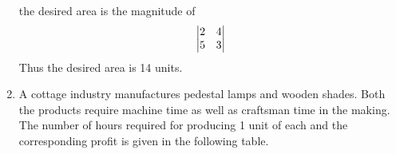 \documentclass[journal,12pt,twocolumn]{IEEEtran}
\renewcommand\thesection{\arabic{section}}
\begin{document}
\begin{enumerate}[label=\thesection.\arabic*.,ref=\thesection.\theenumi]
    the desired area is  the magnitude of 
\begin{align}
 \begin{vmatrix}2 & 4\\5 & 3\end{vmatrix} 
    \end{align}
    Thus the desired area is 14 units.
\item A cottage industry manufactures pedestal lamps and wooden shades. Both the products require machine time as well as craftsman time in the making. The number of hours required for producing 1 unit of each and the corresponding profit is given in the following table. 
	\begin{table}[!ht]
		\centering
{}
	\caption{}
	\label{table}
\end{table}


\end{enumerate}
\end{document}

